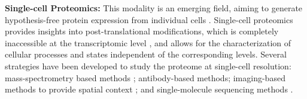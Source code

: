 \textbf{Single-cell Proteomics:}
This modality is an emerging field, aiming to generate hypothesis-free protein expression from individual cells \textbf{\cite{ctortecka_rise_2021,}}. %
Single-cell proteomics provides insights into post-translational modifications, which is completely inaccessible at the transcriptomic level \textbf{\cite{labib_single-cell_2020,ctortecka_rise_2021,petrosius_recent_2022}}, and allows for the %
characterization of cellular processes and states independent of the corresponding  levels.%
 Several strategies have been developed to study the proteome at single-cell resolution: mass-spectrometry based methods \textbf{\cite{petrosius_recent_2022,budnik_scope-ms_2018,zhu_nanodroplet_2018}}; antibody-based methods; imaging-based methods to provide spatial context \textbf{\cite{paul_imaging_2021,chang_imaging_2017,keren_mibi-tof_2019}}; and single-molecule sequencing methods \textbf{\cite{alfaro_emerging_2021}}.\\    %

